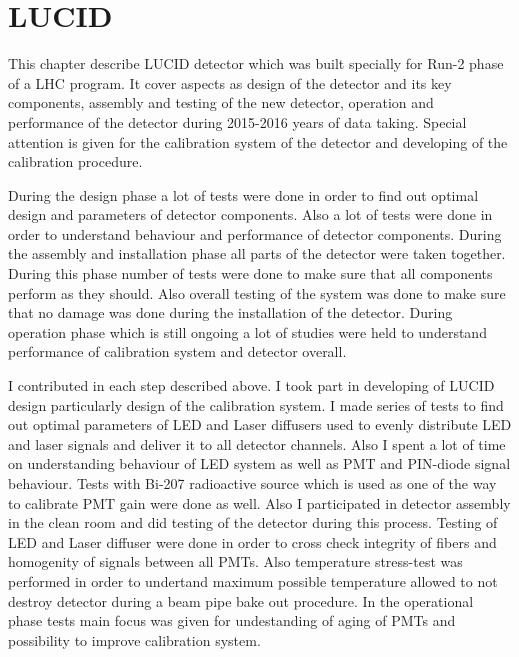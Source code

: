 \chapter{LUCID}
\label{chap:LUCID}


This chapter describe LUCID detector which was built specially for Run-2 phase of a LHC program.
It cover aspects as design of the detector and its key components, assembly and testing of the new detector, 
operation and performance of the detector during 2015-2016 years of data taking.
Special attention is given for the calibration system of the detector and developing of the calibration procedure.

During the design phase a lot of tests were done in order to find out optimal design and parameters of detector components.
Also a lot of tests were done in order to understand behaviour and performance of detector components.
During the assembly and installation phase all parts of the detector were taken together. During this phase number of tests were done
to make sure that all components perform as they should.
Also overall testing of the system was done to make sure that no damage was done during the installation of the detector.
During operation phase which is still ongoing a lot of studies were held to understand performance of calibration system and detector overall.

I contributed in each step described above. I took part in developing of LUCID design particularly design of the calibration system. 
I made series of tests to find out optimal parameters of LED and Laser diffusers used to evenly distribute LED and laser signals and deliver it to all detector channels.
Also I spent a lot of time on understanding behaviour of LED system as well as PMT and PIN-diode signal behaviour.
Tests with Bi-207 radioactive source which is used as one of the way to calibrate PMT gain were done as well.
Also I participated in detector assembly in the clean room and did testing of the detector during this process.
Testing of LED and Laser diffuser were done in order to cross check integrity of fibers and homogenity of signals between all PMTs.
Also temperature stress-test was performed in order to undertand maximum possible temperature allowed to not destroy detector during a beam pipe bake out procedure.
In the operational phase tests main focus was given for undestanding of aging of PMTs and possibility to improve calibration system.

